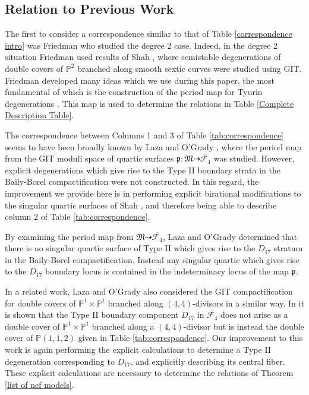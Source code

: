 \documentclass[a4paper]{amsart}
\theoremstyle{definition}
\theoremstyle{plain}
\theoremstyle{remark}
\newcommand{\PS}{\mathbb{P}}
\begin{document}
\subsection{Relation to Previous Work} 
The first to consider a correspondence similar to that of Table \ref{correspondence intro} was Friedman \cite{Fried84} who studied the degree 2 case. Indeed, in the degree 2 situation Friedman used results of Shah \cite{Shah80}, where semistable degenerations of double covers of $\PS^2$ branched along smooth sextic curves were studied using GIT. Friedman developed many ideas which we use during this paper, the most fundamental of which is the construction of the period map for Tyurin degenerations \cite{Fried84,Carlson85}. This map is used to determine the relations in Table \ref{Complete Description Table}.

The correspondence between Columns 1 and 3 of Table \ref{tab:correspondence} seems to have been broadly known by Laza and O'Grady \cite[Table 5]{LOG19}, where the period map from the GIT moduli space of quartic surfaces $\mathfrak{p}:\mathfrak{M}\dashrightarrow\overline{\mathcal{F}_4}$ was studied. However, explicit degenerations which give rise to the Type II boundary strata in the Baily-Borel compactification were not constructed. In this regard, the improvement we provide here is in performing explicit birational modifications to the singular quartic surfaces of Shah \cite{Shah81}, and therefore being able to describe column 2 of Table \ref{tab:correspondence}.

By examining the period map from $\mathfrak{M}\dashrightarrow \overline{\mathcal{F}_4}$, Laza and O'Grady determined that there is no singular quartic surface of Type II which gives rise to the $D_{17}$ stratum in the Baily-Borel compactification. Instead any singular quartic which gives rise to the $D_{17}$ boundary locus is contained in the indeterminacy locus of the map $\mathfrak{p}$.

In a related work, Laza and O'Grady \cite{LOG21} also considered the GIT compactification for double covers of $\PS^1\times \PS^1$ branched along $(4,4)$-divisors in a similar way. In \cite{LOG21} it is shown that the Type II boundary component $D_{17}$ in $\overline{\mathcal{F}_4}$ does not arise as a double cover of $\PS^1\times\PS^1$ branched along a $(4,4)$-divisor but is instead the double cover of $\PS(1,1,2)$ given in Table \ref{tab:correspondence}. Our improvement to this work is again performing the explicit calculations to determine a Type II degeneration corresponding to $D_{17}$, and explicitly describing its central fiber. These explicit calculations are necessary to determine the relations of Theorem \ref{list of nef models}.
\end{document}
